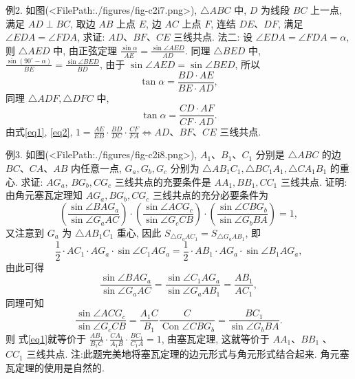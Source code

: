 例2. 如图(<FilePath:./figures/fig-c2i7.png>), $\triangle A B C$ 中, $D$ 为线段 $B C$ 上一点, 满足 $A D \perp B C$, 取边 $A B$ 上点 $E$, 边 $A C$ 上点 $F$, 连结 $D E 、 D F$, 满足 $\angle E D A=\angle F D A$, 求证: $A D 、 B F 、 C E$ 三线共点.
法二: 设 $\angle E D A=\angle F D A=\alpha$, 则 $\triangle A E D$ 中, 由正弦定理 $\frac{\sin \alpha}{A E}= \frac{\sin \angle A E D}{A D}$.
同理 $\triangle B E D$ 中, $\frac{\sin \left(90^{\circ}-\alpha\right)}{B E}=\frac{\sin \angle B E D}{B D}$, 由于 $\sin \angle A E D= \sin \angle B E D$,
所以
$$
\tan \alpha=\frac{B D \cdot A E}{B E \cdot A D}, \label{eq1}
$$
同理 $\triangle A D F, \triangle D F C$ 中,
$$
\tan \alpha=\frac{C D \cdot A F}{C F \cdot A D} . \label{eq2}
$$
由式\ref{eq1}, \ref{eq2}, $1=\frac{A E}{E B} \cdot \frac{B D}{D C} \cdot \frac{C F}{F A} \Leftrightarrow A D 、 B F 、 C E$ 三线共点.



例3. 如图(<FilePath:./figures/fig-c2i8.png>), $A_1 、 B_1 、 C_1$ 分别是 $\triangle A B C$ 的边 $B C 、 C A 、 A B$ 内任意一点, $G_a, G_b, G_c$ 分别为 $\triangle A B_1 C_1, \triangle B C_1 A_1, \triangle C A_1 B_1$ 的重心.
求证: $A G_a$, $B G_b, C G_c$ 三线共点的充要条件是 $A A_1, B B_1, C C_1$ 三线共点.
证明:由角元塞瓦定理知 $A G_a, B G_b, C G_c$ 三线共点的充分必要条件为
$$
\left(\frac{\sin \angle B A G_a}{\sin \angle G_a A C}\right) \cdot\left(\frac{\sin \angle A C G_c}{\sin \angle G_c C B}\right) \cdot\left(\frac{\sin \angle C B G_b}{\sin \angle G_b B A}\right)=1, \label{eq1}
$$
又注意到 $G_a$ 为 $\triangle A B_1 C_1$ 重心, 因此 $S_{\triangle G_a A C_1}=S_{\triangle G_a A B_1}$, 即
$$
\frac{1}{2} \cdot A C_1 \cdot A G_a \cdot \sin \angle C_1 A G_a=\frac{1}{2} \cdot A B_1 \cdot A G_a \cdot \sin \angle B_1 A G_a,
$$
由此可得
$$
\frac{\sin \angle B A G_a}{\sin \angle G_a A C}=\frac{\sin \angle C_1 A G_a}{\sin \angle G_a A B_1}=\frac{A B_1}{A C_1},
$$
同理可知
$$
\frac{\sin \angle A C G_c}{\sin \angle G_c C B}=\frac{A_1 C}{B_1} \frac{C}{\operatorname{Con} \angle C B G_b}=\frac{B C_1}{\sin \angle G_b B A} .
$$
则 式\ref{eq1}就等价于 $\frac{A B_1}{B_1 C} \cdot \frac{C A_1}{A_1 B} \cdot \frac{B C_1}{C_1 A}=1$, 由塞瓦定理, 这就等价于 $A A_1 、 B B_1$ 、 $C C_1$ 三线共点.
注:此题完美地将塞瓦定理的边元形式与角元形式结合起来.
角元塞瓦定理的使用是自然的.



